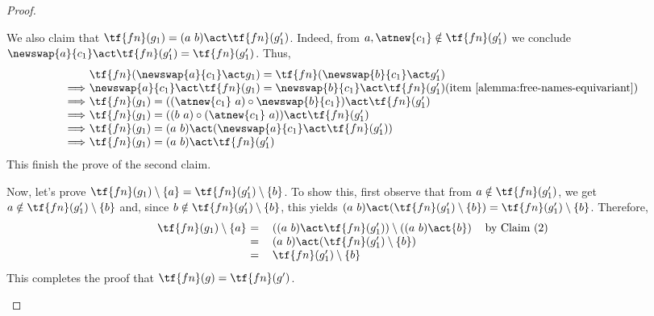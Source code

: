 \begin{proof}
\begin{enumerate}
    \begin{claim}[2]
         We also claim that $\tf{fn}(g_1) = (a \ b)\act \tf{fn}(g_1')$. Indeed, from $a,\atnew{c_1} \notin \tf{fn}(g_1')$ we conclude $\newswap{a}{c_1}\act \tf{fn}(g_1') = \tf{fn}(g_1')$. Thus,
        \begin{equation*}
            \begin{tabular}{@{}l@{ }l@{}l@{}}
               & $\tf{fn}(\newswap{a}{c_1}\act g_1) = \tf{fn}(\newswap{b}{c_1}\act g_1')$ \\
               $\Longrightarrow$ & $\newswap{a}{c_1}\act \tf{fn}(g_1) = \newswap{b}{c_1}\act\tf{fn}(g_1')$ & (item~\ref{alemma:free-names-equivariant})\\
               $\Longrightarrow$ &  $\tf{fn}(g_1) = ((\atnew{c_1} \ a)\circ\newswap{b}{c_1})\act\tf{fn}(g_1')$ & \\
               $\Longrightarrow$ &  $\tf{fn}(g_1) = ((b \ a)\circ(\atnew{c_1} \ a))\act\tf{fn}(g_1')$ & \\
               $\Longrightarrow$ &   $\tf{fn}(g_1) = (a \ b)\act(\newswap{a}{c_1}\act\tf{fn}(g_1'))$ & \\
               $\Longrightarrow$ &  $\tf{fn}(g_1) = (a \ b)\act \tf{fn}(g_1')$ &
            \end{tabular}
        \end{equation*}
        This finish the prove of the second claim.
    \end{claim}
    
   Now, let's prove $\tf{fn}(g_1) \setminus\{a\} = \tf{fn}(g_1')\setminus\{b\}$. To show this, first observe that from $a\notin \tf{fn}(g_1')$, we get $a\notin \tf{fn}(g_1')\setminus\{b\}$ and, since $b\notin \tf{fn}(g_1')\setminus\{b\}$, this yields $(a \ b)\act(\tf{fn}(g_1')\setminus\{b\}) = \tf{fn}(g_1')\setminus\{b\}$. Therefore,
        \begin{equation*}
            \begin{tabular}{@{}l@{ }lll@{}}
                $\tf{fn}(g_1)\setminus\{a\}$ & $=$ &  $((a \ b)\act\tf{fn}(g_1'))\setminus((a \ b)\act\{b\})$ & by Claim (2) \\
                 & $=$ & $(a \ b)\act(\tf{fn}(g_1')\setminus\{b\})$ \\
                 & $=$ & $\tf{fn}(g_1')\setminus\{b\}$ 
            \end{tabular}
        \end{equation*}
        This completes the proof that $\tf{fn}(g) = \tf{fn}(g')$.


\end{enumerate}
\end{proof}
